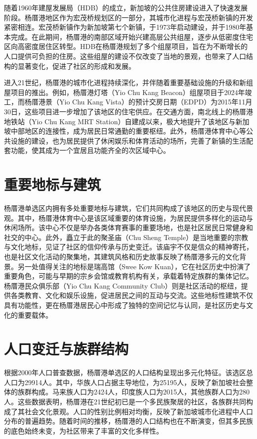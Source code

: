 \documentclass[11pt,a4paper,twoside,openany]{book}
\begin{document}
随着1960年建屋发展局（HDB）的成立，新加坡的公共住房建设进入了快速发展阶段。杨厝港地区作为宏茂桥规划区的一部分，其城市化进程与宏茂桥新镇的开发紧密相连。宏茂桥新镇作为新加坡第七个新镇，于1973年启动建设，并于1980年基本完成。在此期间，杨厝港的南部区域开始兴建高层公共组屋，逐步从低密度住宅区向高密度居住区转型。HDB在杨厝港规划了多个组屋项目，旨在为不断增长的人口提供可负担的住房。这些组屋的建设不仅改变了当地的景观，也带来了人口结构的显著变化，促进了社区的形成和发展。

进入21世纪，杨厝港的城市化进程持续深化，并伴随着重要基础设施的升级和新组屋项目的推出。例如，杨厝港灯塔（Yio Chu Kang Beacon）组屋项目于2024年竣工，而杨厝港景（Yio Chu Kang Vista）的预计交房日期（EDPD）为2015年11月30日，这些项目进一步增加了该地区的住宅供应。在交通方面，南北线上的杨厝港地铁站（Yio Chu Kang MRT Station）自建成以来，极大地提升了该地区与新加坡中部地区的连接性，成为居民日常通勤的重要枢纽。此外，杨厝港体育中心等公共设施的建设，也为居民提供了休闲娱乐和体育活动的场所，完善了新镇的生活配套功能，使其成为一个宜居且功能齐全的次区域中心。

\section{重要地标与建筑}
杨厝港单选区内拥有多处重要地标与建筑，它们共同构成了该地区的历史与现代景观。其中，杨厝港体育中心是该区域重要的体育设施，为居民提供多样化的运动与休闲场所。该中心不仅是举办各类体育赛事的重要场地，也是社区居民日常健身和社交的中心。此外，矗立于此的聚圣庙（Chu Sheng Temple）是当地重要的宗教与文化地标，见证了社区的信仰传承与历史变迁。该庙宇不仅是信众的精神寄托，也是社区文化活动的聚集地，其建筑风格和历史故事反映了杨厝港多元的文化背景。另一处值得关注的地标是瑞高馆（Swee Kow Kuan），它在社区历史中扮演了重要角色，可能与早期的宗乡会馆或教育机构有关，承载着特定族群的集体记忆。杨厝港民众俱乐部（Yio Chu Kang Community Club）则是社区活动的枢纽，提供各类教育、文化和娱乐设施，促进居民之间的互动与交流。这些地标性建筑不仅具有功能性，更在杨厝港居民心中形成了独特的空间记忆与认同，是社区历史与文化的重要载体。

\section{人口变迁与族群结构}
根据2000年人口普查数据，杨厝港单选区的人口结构呈现出多元化特征。该选区总人口为29914人。其中，华族人口占据主导地位，为25195人，反映了新加坡社会整体的族群构成。马来族人口为2424人，印度族人口为2015人，其他族群人口为280人。这些数据表明，杨厝港在21世纪初已是一个多民族聚居的社区，各族群共同构成了其社会文化景观。人口的性别比例相对均衡，反映了新加坡城市化进程中人口分布的普遍趋势。随着时间的推移，杨厝港的人口结构也在不断演变，但其多民族的底色始终未变，为社区带来了丰富的文化多样性。
\end{document}
